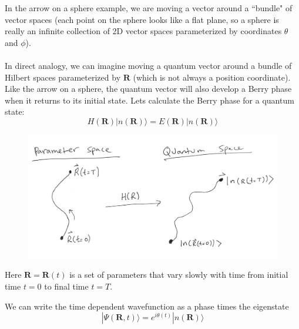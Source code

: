 \documentclass[a4paper,12pt]{article}
\renewcommand{\vec}[1]{\boldsymbol{\mathbf{#1}}}
\begin{document}
In the arrow on a sphere example, we are moving a vector around a ``bundle" of vector spaces (each point on the sphere looks like a flat plane, so a sphere is really an infinite collection of 2D vector spaces parameterized by coordinates $\theta$ and $\phi$).
\\ \\
In direct analogy, we can imagine moving a quantum vector around a bundle of Hilbert spaces parameterized by $\vec{R}$ (which is not always a position coordinate).  Like the arrow on a sphere, the quantum vector will also develop a Berry phase when it returns to its initial state.  Lets calculate the Berry phase for a quantum state:
\begin{equation}
H(\vec{R}) | n(\vec{R}) \rangle = E(\vec{R}) | n(\vec{R}) \rangle
\end{equation}

\begin{figure}[h!]
\centering
\includegraphics[width=150mm,keepaspectratio=true]{param.jpg}
\end{figure}

Here $\vec{R}=\vec{R}(t)$ is a set of parameters that vary slowly with time from initial time $t=0$ to final time $t=T$.

We can write the time dependent wavefunction as a phase times the eigenstate
\begin{equation}
| \Psi(\vec{R},t) \rangle = e^{i\theta(t)} | n(\vec{R}) \rangle
\end{equation}
\end{document}
